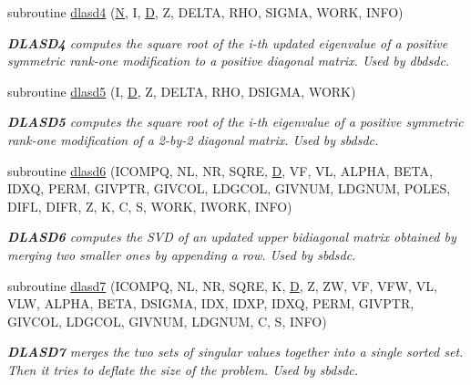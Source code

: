 \begin{DoxyCompactItemize}
subroutine \hyperlink{group__auxOTHERauxiliary_gaf0ba74a3731059f524f3bdb703fd6fb4}{dlasd4} (\hyperlink{polmisc_8c_a0240ac851181b84ac374872dc5434ee4}{N}, I, \hyperlink{odrpack_8h_a7dae6ea403d00f3687f24a874e67d139}{D}, Z, D\+E\+L\+T\+A, R\+H\+O, S\+I\+G\+M\+A, W\+O\+R\+K, I\+N\+F\+O)
\begin{DoxyCompactList}\small\item\em {\bfseries D\+L\+A\+S\+D4} computes the square root of the i-\/th updated eigenvalue of a positive symmetric rank-\/one modification to a positive diagonal matrix. Used by dbdsdc. \end{DoxyCompactList}\item 
subroutine \hyperlink{group__auxOTHERauxiliary_gac354f735ef3e53f9ca32242d2db96f74}{dlasd5} (I, \hyperlink{odrpack_8h_a7dae6ea403d00f3687f24a874e67d139}{D}, Z, D\+E\+L\+T\+A, R\+H\+O, D\+S\+I\+G\+M\+A, W\+O\+R\+K)
\begin{DoxyCompactList}\small\item\em {\bfseries D\+L\+A\+S\+D5} computes the square root of the i-\/th eigenvalue of a positive symmetric rank-\/one modification of a 2-\/by-\/2 diagonal matrix. Used by sbdsdc. \end{DoxyCompactList}\item 
subroutine \hyperlink{group__auxOTHERauxiliary_ga0e070b3e60c4a799927b934a17031fba}{dlasd6} (I\+C\+O\+M\+P\+Q, N\+L, N\+R, S\+Q\+R\+E, \hyperlink{odrpack_8h_a7dae6ea403d00f3687f24a874e67d139}{D}, V\+F, V\+L, A\+L\+P\+H\+A, B\+E\+T\+A, I\+D\+X\+Q, P\+E\+R\+M, G\+I\+V\+P\+T\+R, G\+I\+V\+C\+O\+L, L\+D\+G\+C\+O\+L, G\+I\+V\+N\+U\+M, L\+D\+G\+N\+U\+M, P\+O\+L\+E\+S, D\+I\+F\+L, D\+I\+F\+R, Z, K, C, S, W\+O\+R\+K, I\+W\+O\+R\+K, I\+N\+F\+O)
\begin{DoxyCompactList}\small\item\em {\bfseries D\+L\+A\+S\+D6} computes the S\+V\+D of an updated upper bidiagonal matrix obtained by merging two smaller ones by appending a row. Used by sbdsdc. \end{DoxyCompactList}\item 
subroutine \hyperlink{group__auxOTHERauxiliary_ga5ec18a9b77aca48cfc490ad5022eeafe}{dlasd7} (I\+C\+O\+M\+P\+Q, N\+L, N\+R, S\+Q\+R\+E, K, \hyperlink{odrpack_8h_a7dae6ea403d00f3687f24a874e67d139}{D}, Z, Z\+W, V\+F, V\+F\+W, V\+L, V\+L\+W, A\+L\+P\+H\+A, B\+E\+T\+A, D\+S\+I\+G\+M\+A, I\+D\+X, I\+D\+X\+P, I\+D\+X\+Q, P\+E\+R\+M, G\+I\+V\+P\+T\+R, G\+I\+V\+C\+O\+L, L\+D\+G\+C\+O\+L, G\+I\+V\+N\+U\+M, L\+D\+G\+N\+U\+M, C, S, I\+N\+F\+O)
\begin{DoxyCompactList}\small\item\em {\bfseries D\+L\+A\+S\+D7} merges the two sets of singular values together into a single sorted set. Then it tries to deflate the size of the problem. Used by sbdsdc. \end{DoxyCompactList}\item 

\end{DoxyCompactItemize}
